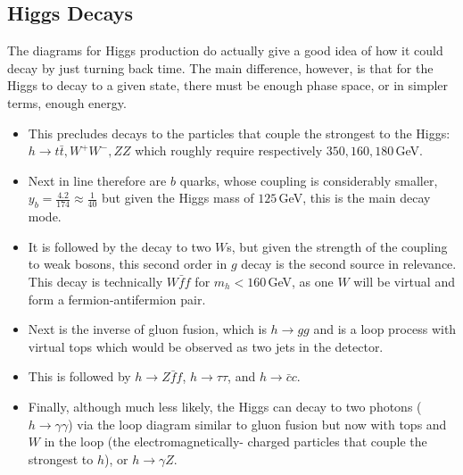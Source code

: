\documentclass[a4paper, 11pt, normalem]{report}
\begin{document}
\subsection{Higgs Decays}
The diagrams for Higgs production do actually give a good idea of how it could decay by just turning back time.
The main difference, however, is that for the Higgs to decay to a given state, there must be enough phase space, or in simpler terms, enough energy.
\begin{itemize}
    \item This precludes decays to the particles that couple the strongest to the Higgs: $h\to t\bar{t},W^+W^-,ZZ$ which roughly require respectively $350,160,180\,$GeV.
    \item Next in line therefore are $b$ quarks, whose coupling is considerably smaller, $y_b=\frac{4.2}{174}\approx\frac{1}{40}$ but given the Higgs mass of $125\,$GeV, this is the main decay mode.
    \item It is followed by the decay to two $W$s, but given the strength of the coupling to weak bosons, this second order in $g$ decay is the second source in relevance.
        This decay is technically $W\bar{f}f$ for $m_h<160\,$GeV, as one $W$ will be virtual and form a fermion-antifermion pair.
    \item Next is the inverse of gluon fusion, which is $h\to gg$ and is a loop process with virtual tops which would be observed as two jets in the detector.
    \item This is followed by $h\to Z\bar{f}f$, $h\to\tau\tau$, and $h\to\bar{c}c$.
    \item Finally, although much less likely, the Higgs can decay to two photons ($h\to\gamma\gamma$) via the loop diagram similar to gluon fusion but now with tops and $W$ in the loop (the electromagnetically- charged particles that couple the strongest to $h$), or $h\to\gamma Z$.
\end{itemize}
\end{document}
